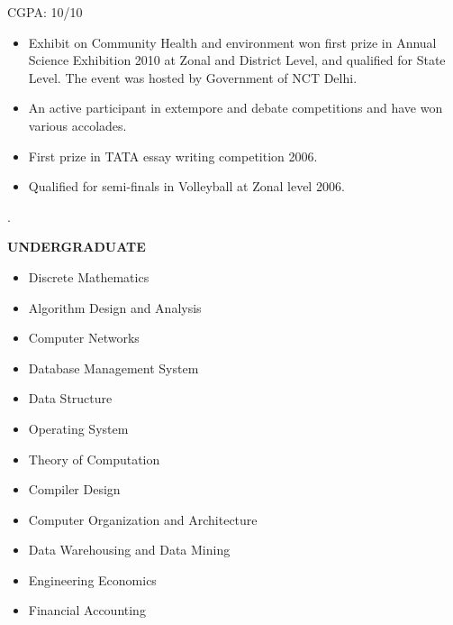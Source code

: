 \vspace{-1em}

CGPA: 10/10


\begin{itemize}
    \item Exhibit on Community Health and environment won first prize in Annual Science Exhibition 2010 at Zonal and District Level, and qualified for State Level. The event was hosted by Government of NCT Delhi.
    \item An active participant in extempore and debate competitions and have won various accolades.
    \item First prize in TATA essay writing competition 2006.
    \item Qualified for semi-finals in Volleyball at Zonal level 2006. 
\end{itemize}.

\vspace{-1.3em}


\textbf{UNDERGRADUATE}

\begin{itemize}
\item Discrete Mathematics
\item Algorithm Design and Analysis
\item Computer Networks
\item Database Management System
\item Data Structure
\item Operating System
\item Theory of Computation
\item Compiler Design
\item Computer Organization and Architecture
\item Data Warehousing and Data Mining 
\item Engineering Economics
\item Financial Accounting
\end{itemize}


